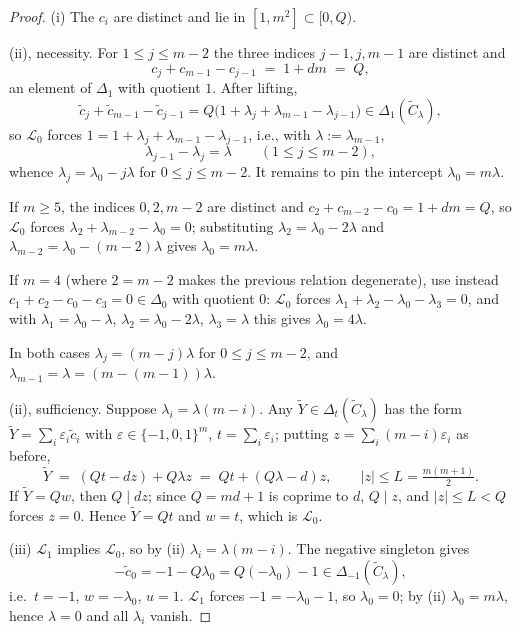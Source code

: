 \documentclass[11pt]{article}
\theoremstyle{definition}
\theoremstyle{remark}
\newcommand{\loc}[1]{\mathcal{L}_{#1}}
\begin{document}
\begin{proof}
(i) The $c_i$ are distinct and lie in $[1,m^2]\subset[0,Q)$.

(ii), necessity. For $1\le j\le m-2$ the three indices $j-1,j,m-1$ are
distinct and
\[
c_j+c_{m-1}-c_{j-1} \;=\; 1+dm \;=\; Q ,
\]
an element of $\Delta_1$ with quotient $1$. After lifting,
\[
\widetilde c_j+\widetilde c_{m-1}-\widetilde c_{j-1}
= Q\bigl(1+\lambda_j+\lambda_{m-1}-\lambda_{j-1}\bigr)\in
\Delta_1(\widetilde C_\lambda),
\]
so $\loc0$ forces $1=1+\lambda_j+\lambda_{m-1}-\lambda_{j-1}$, i.e., with
$\lambda:=\lambda_{m-1}$,
\begin{equation}\label{eq:affine}
\lambda_{j-1}-\lambda_j=\lambda\qquad(1\le j\le m-2),
\end{equation}
whence $\lambda_j=\lambda_0-j\lambda$ for $0\le j\le m-2$. It remains to
pin the intercept $\lambda_0=m\lambda$.

If $m\ge5$, the indices $0,2,m-2$ are distinct and
$c_2+c_{m-2}-c_0=1+dm=Q$, so $\loc0$ forces
$\lambda_2+\lambda_{m-2}-\lambda_0=0$; substituting
$\lambda_2=\lambda_0-2\lambda$ and $\lambda_{m-2}=\lambda_0-(m-2)\lambda$
gives $\lambda_0=m\lambda$.

If $m=4$ (where $2=m-2$ makes the previous relation degenerate), use
instead $c_1+c_2-c_0-c_3=0\in\Delta_0$ with quotient $0$: $\loc0$ forces
$\lambda_1+\lambda_2-\lambda_0-\lambda_3=0$, and with
$\lambda_1=\lambda_0-\lambda$, $\lambda_2=\lambda_0-2\lambda$,
$\lambda_3=\lambda$ this gives $\lambda_0=4\lambda$.

In both cases $\lambda_j=(m-j)\lambda$ for $0\le j\le m-2$, and
$\lambda_{m-1}=\lambda=(m-(m-1))\lambda$.

(ii), sufficiency. Suppose $\lambda_i=\lambda(m-i)$. Any
$\widetilde Y\in\Delta_t(\widetilde C_\lambda)$ has the form
$\widetilde Y=\sum_i\varepsilon_i\widetilde c_i$ with
$\varepsilon\in\{-1,0,1\}^m$, $t=\sum_i\varepsilon_i$; putting
$z=\sum_i(m-i)\varepsilon_i$ as before,
\[
\widetilde Y \;=\; (Qt-dz)+Q\lambda z \;=\; Qt+(Q\lambda-d)z,
\qquad |z|\le L=\tfrac{m(m+1)}2 .
\]
If $\widetilde Y=Qw$, then $Q\mid dz$; since $Q=md+1$ is coprime to $d$,
$Q\mid z$, and $|z|\le L<Q$ forces $z=0$. Hence $\widetilde Y=Qt$ and
$w=t$, which is $\loc0$.

(iii) $\loc1$ implies $\loc0$, so by (ii) $\lambda_i=\lambda(m-i)$. The
negative singleton gives
\[
-\widetilde c_0=-1-Q\lambda_0=Q(-\lambda_0)-1\in
\Delta_{-1}(\widetilde C_\lambda),
\]
i.e.\ $t=-1$, $w=-\lambda_0$, $u=1$. $\loc1$ forces $-1=-\lambda_0-1$,
so $\lambda_0=0$; by (ii) $\lambda_0=m\lambda$, hence $\lambda=0$ and all
$\lambda_i$ vanish.
\end{proof}
\end{document}
